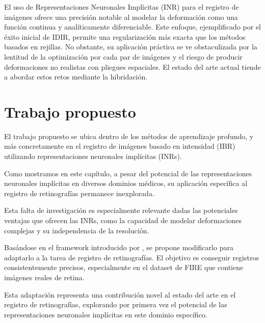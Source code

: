 El uso de Representaciones Neuronales Implícitas (INR) para el registro de imágenes ofrece una precisión notable al modelar la deformación como una función continua y analíticamente diferenciable. Este enfoque, ejemplificado por el éxito inicial de IDIR, permite una regularización más exacta que los métodos basados en rejillas. No obstante, su aplicación práctica se ve obstaculizada por la lentitud de la optimización por cada par de imágenes y el riesgo de producir deformaciones no realistas con pliegues espaciales. El estado del arte actual tiende a abordar estos retos mediante la hibridación.

\section{Trabajo propuesto}
\label{sec:Traballo proposto}

El trabajo propuesto se ubica dentro de los métodos de aprendizaje profundo, y más concretamente en el registro de imágenes basado en intensidad (IBR) utilizando representaciones neuronales implícitas (INRs).

Como mostramos en este capítulo, a pesar del potencial de las representaciones neuronales implícitas en diversos dominios médicos, su aplicación específica al registro de retinografías permanece inexplorada.

Esta falta de investigación es especialmente relevante dadas las potenciales ventajas que ofrecen las INRs, como la capacidad de modelar deformaciones complejas y su independencia de la resolución.

Basándose en el framework introducido por \cite{wolterink2021implicit}, se propone modificarlo para adaptarlo a la tarea de registro de retinografías. El objetivo es conseguir registros consistentemente precisos, especialmente en el dataset de FIRE que contiene imágenes reales de retina.

Esta adaptación representa una contribución novel al estado del arte en el registro de retinografías, explorando por primera vez el potencial de las representaciones neuronales implícitas en este dominio específico.